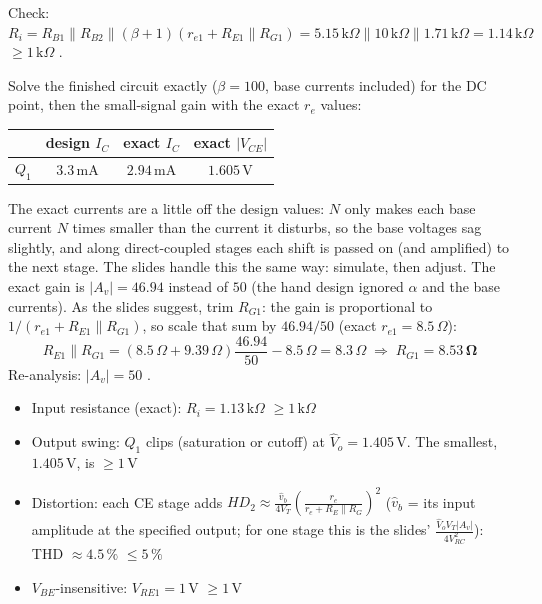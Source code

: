 \documentclass[11pt]{article}
\newcommand{\solstep}[2]{\par\medskip{\color{stepc}\textbf{Step #1 --- #2}}\par\nopagebreak}
\begin{document}
Check: $R_i = R_{B1}\|R_{B2}\|(\beta+1)(r_{e1} + R_{E1}\|R_{G1}) = 5.15\,\mathrm{k}\Omega\|10\,\mathrm{k}\Omega\|1.71\,\mathrm{k}\Omega = 1.14\,\mathrm{k}\Omega$ $\ge 1\,\mathrm{k}\Omega$ \checkmark.
\solstep{4}{Check by analysis}Solve the finished circuit exactly ($\beta=100$, base currents included) for the DC point, then the small-signal gain with the exact $r_e$ values:\begin{center}\renewcommand{\arraystretch}{1.35}
\begin{tabular}{cccc}
\toprule
 & design $I_C$ & exact $I_C$ & exact $|V_{CE}|$ \\
\midrule
$Q_{1}$ & $3.3\,\mathrm{m}\mathrm{A}$ & $2.94\,\mathrm{m}\mathrm{A}$ & $1.605\,\mathrm{V}$ \\
\bottomrule
\end{tabular}\end{center}
The exact currents are a little off the design values: $N$ only makes each base current $N$ times smaller than the current it disturbs, so the base voltages sag slightly, and along direct-coupled stages each shift is passed on (and amplified) to the next stage. The slides handle this the same way: simulate, then adjust. The exact gain is $|A_v| = 46.94$ instead of $50$ (the hand design ignored $\alpha$ and the base currents). As the slides suggest, trim $R_{G1}$: the gain is proportional to $1/(r_{e1} + R_{E1}\|R_{G1})$, so scale that sum by $46.94/50$ (exact $r_{e1} = 8.5\,\Omega$):\[R_{E1}\|R_{G1} = (8.5\,\Omega + 9.39\,\Omega)\frac{46.94}{50} - 8.5\,\Omega = 8.3\,\Omega \;\Rightarrow\; R_{G1} = \mathbf{8.53\,\Omega}\]Re-analysis: $|A_v| = 50$ \checkmark. \begin{itemize}[leftmargin=*,itemsep=2pt]
\item Input resistance (exact): $R_i = 1.13\,\mathrm{k}\Omega$ $\ge 1\,\mathrm{k}\Omega$ \checkmark
\item Output swing: $Q_{1}$ clips (saturation or cutoff) at $\hat V_o = 1.405\,\mathrm{V}$. The smallest, $1.405\,\mathrm{V}$, is $\ge 1$\,V \checkmark
\item Distortion: each CE stage adds $HD_2 \approx \frac{\hat v_b}{4V_T}\left(\frac{r_e}{r_e + R_E\|R_G}\right)^2$ ($\hat v_b$ = its input amplitude at the specified output; for one stage this is the slides' $\frac{\hat V_o V_T |A_v|}{4V_{RC}^2}$): THD $\approx 4.5\,\%$ $\le 5\,\%$ \checkmark
\item $V_{BE}$-insensitive: $V_{RE1} = 1$\,V $\ge 1$\,V \checkmark
\end{itemize}
\end{document}
